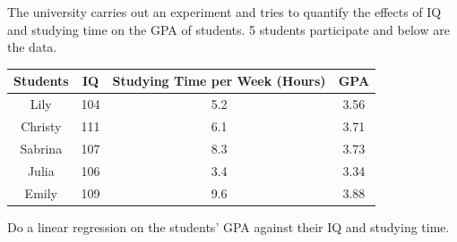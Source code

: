 \begin{exmp}
\label{exmp:GPAregress}
The university carries out an experiment and tries to quantify the effects of IQ and studying time on the GPA of students. 5 students participate and below are the data.
\begin{center}
\begin{tabular}{|c|c|c|c|}
\hline
Students & IQ & Studying Time per Week (Hours) & GPA \\
\hline
Lily & 104 & 5.2 & 3.56 \\
\hline
Christy & 111 & 6.1 & 3.71 \\
\hline
Sabrina & 107 & 8.3 & 3.73 \\
\hline
Julia & 106 & 3.4 & 3.34 \\
\hline
Emily & 109 & 9.6 & 3.88 \\
\hline
\end{tabular}
\end{center} 
Do a linear regression on the students' GPA against their IQ and studying time.
\end{exmp}
